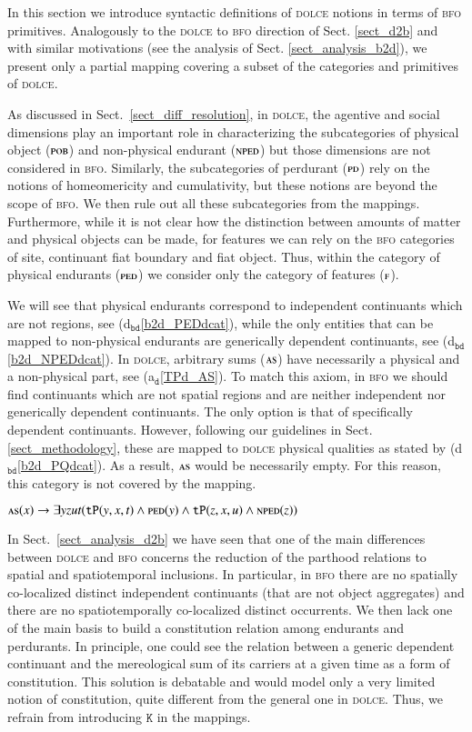 \documentclass[ao]{iosart2x}
\newcommand{\bflist}{\begin{list}{}{\setlength{\topsep}{2mm}\setlength{\parsep}{0mm}\setlength{\leftmargin}{9.2mm}\setlength{\labelwidth}{8mm}}}
\newcommand{\eflist}{\end{list}}
\newcommand{\dolceAxLabel}{\textrm{a$_\texttt{d}$}}
\newcommand{\bdDefLabel}{\textrm{d$_\texttt{bd}$}}
\newcounter{cntax}
\newcommand{\dolceax}[1]{\refstepcounter{cntax}\begin{small}{\bf \dolceAxLabel\thecntax\label{#1}}\end{small}}
\newcommand{\refdolceax}[1]{({\dolceAxLabel}\ref{#1})}
\newcommand{\refbddf}[1]{({\bdDefLabel}\ref{#1})}
\newcommand{\pr}[1]{\mathtt{#1}}
\newcommand{\dolce}{{\textsc{dolce}}}
\newcommand{\bfo}{{\textsc{bfo}}}
\newcommand {\ASdcat} {\textsc{as}}
\newcommand {\Fdcat} {\textsc{f}}
\newcommand {\NPEDdcat} {\textsc{nped}}
\newcommand {\PDdcat} {\textsc{pd}}
\newcommand {\PEDdcat} {\textsc{ped}}
\newcommand {\POBdcat} {\textsc{pob}}
\newcommand {\TPd} {\ensuremath{\pr{tP}}}
\newcommand {\Kd} {\ensuremath{\pr{K}}}
\begin{document}
In this section we introduce syntactic definitions of {\dolce} notions in terms of {\bfo} primitives. Analogously to the {\dolce} to {\bfo} direction of Sect. \ref{sect_d2b} and with similar motivations (see the analysis of Sect. \ref{sect_analysis_b2d}), we present only a partial mapping covering a subset of the categories and primitives of {\dolce}.  

As discussed in Sect.~\ref{sect_diff_resolution}, in {\dolce}, the agentive and social dimensions play an important role in characterizing the subcategories of physical object ($\POBdcat$) and non-physical endurant ($\NPEDdcat$) but those dimensions are not considered in {\bfo}. Similarly, the subcategories of perdurant ($\PDdcat$) rely on the notions of homeomericity and cumulativity, but these notions are beyond the scope of {\bfo}. We then rule out all these subcategories from the mappings. Furthermore, while it is not clear how the distinction between amounts of matter and physical objects can be made, for features we can rely on the {\bfo} categories of site, continuant fiat boundary and fiat object. Thus, within the category of physical endurants ($\PEDdcat$) we consider only the category of features ($\Fdcat$). 

We will see that physical endurants correspond to independent continuants which are not regions,
see \refbddf{b2d_PEDdcat}, while the only entities that can be mapped to non-physical endurants are generically dependent continuants, see \refbddf{b2d_NPEDdcat}. In {\dolce}, arbitrary sums ($\ASdcat$) have necessarily a physical and a non-physical part, see \refdolceax{TPd_AS}. To match this axiom, in {\bfo} we should find continuants which are not spatial regions and are neither independent nor generically dependent continuants. The only option is that of specifically dependent continuants. However, following our guidelines in Sect. \ref{sect_methodology}, these are mapped to {\dolce} physical qualities as stated by \refbddf{b2d_PQdcat}. As a result, $\ASdcat$ would be necessarily empty. For this reason, this category is not covered by the mapping.   
%
\bflist
\item[\dolceax{TPd_AS}] $\ASdcat(x) \to \exists yzut(\TPd(y,x,t) \land \PEDdcat(y) \land \TPd(z,x,u) \land \NPEDdcat(z))$  
\eflist

In Sect.~\ref{sect_analysis_d2b} we have seen that one of the main differences between {\dolce} and {\bfo} concerns the reduction of the parthood relations to spatial and spatiotemporal inclusions. In particular, in {\bfo} there are no spatially co-localized distinct independent continuants (that are not object aggregates) and there are no spatiotemporally co-localized distinct occurrents. We then lack one of the main basis to build a constitution relation among endurants and perdurants. In principle, one could see the relation between a generic dependent continuant and the mereological sum of its carriers at a given time as a form of constitution. This solution is debatable and would model only a very limited notion of constitution, quite different from the general one in {\dolce}. Thus, we refrain from introducing $\Kd$ in the mappings.  
\end{document}
